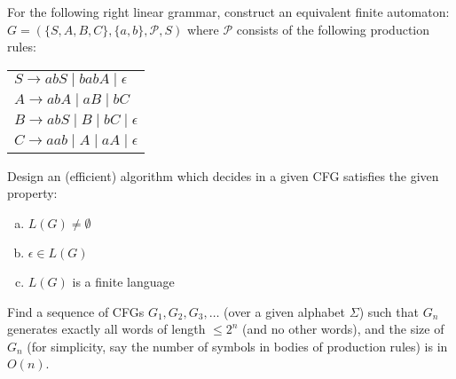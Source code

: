 \documentclass[a4paper,12pt]{amsart}
\begin{document}
\medskip\begin{problem} 
    
    For the following right linear grammar, construct an equivalent finite automaton: $G=(\{S,A,B,C\},\{a,b\},\mathcal P,S)$ where $\mathcal P$ consists of the following production rules:

    \bigskip
        
    \begin{center}
        \begin{tabular}{l}
            $S\rightarrow abS\mid babA\mid \epsilon $\\
            $A\rightarrow abA\mid aB \mid  bC$\\
            $B\rightarrow abS\mid B\mid bC\mid \epsilon $\\
            $C\rightarrow aab\mid A\mid aA\mid \epsilon $
        \end{tabular}
    \end{center}
    
\end{problem}


\medskip\begin{problem}
    
    Design an (efficient) algorithm which decides in a given CFG satisfies the given property:
    
    \medskip

    \begin{enumerate}[(a)]
        \item $L(G)\neq\emptyset$
        \item $\epsilon\in L(G)$
        \item $L(G)$ is a finite language
    \end{enumerate}

\end{problem}
    

\medskip\begin{problem}
    
    Find a sequence of CFGs $G_1,G_2,G_3,\dots$ (over a given alphabet $\Sigma$) such that $G_n$ generates exactly all words of length $\leq 2^n$ (and no other words), and the size of $G_n$ (for simplicity, say the number of symbols in bodies of production rules) is in $O(n)$.
    

\end{problem}
\end{document}
